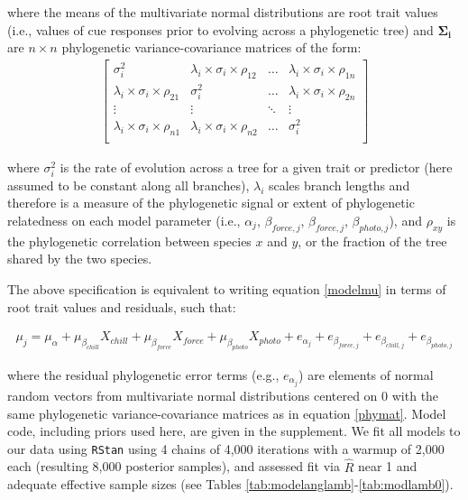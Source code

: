 \documentclass[11pt]{article}
\begin{document}
\noindent where the means of the multivariate normal distributions are root trait values (i.e., values of cue responses prior to evolving across a phylogenetic tree) and $\boldsymbol{\Sigma_i}$ %
are $n \times n$ phylogenetic variance-covariance matrices of the form: \\ 
\begin{align}
  \label{phymat}
\begin{bmatrix}
  \sigma^2_i & \lambda_i \times \sigma_{i} \times \rho_{12} & \ldots & \lambda_i \times \sigma_{i} \times \rho_{1n} \\
  \lambda_i \times \sigma_i \times \rho_{21} & \sigma^2_i & \ldots & \lambda_i \times \sigma_{i} \times \rho_{2n} \\
  \vdots & \vdots & \ddots & \vdots \\
  \lambda_i \times \sigma_i \times \rho_{n1} & \lambda_i \times \sigma_i \times \rho_{n2} & \ldots & \sigma^2_i \\
\end{bmatrix}
\end{align}

\noindent where $\sigma_i^2$ is the rate of evolution across a tree for a given trait or predictor (here assumed to be constant along all branches), $\lambda_i$ scales branch lengths and therefore is a measure of the phylogenetic signal or extent of phylogenetic relatedness on each model parameter (i.e., $\alpha_{j}$, $\beta_{force,j}$, $\beta_{force,j}$, $\beta_{photo,j}$), and $\rho_{xy}$ is the phylogenetic correlation between species $x$ and $y$, or the fraction of the tree shared by the two species.

The above specification is equivalent to writing equation \ref{modelmu} in terms of root trait values and residuals, such that:

\begin{align}
  \label{eqfive}
  \mu_j = \mu_\alpha + \mu_{\beta_{chill}} X_{chill} + \mu_{\beta_{force}} X_{force} + \mu_{\beta_{photo}} X_{photo} + e_{\alpha_{j}} + e_{\beta_{force,j}} + e_{\beta_{chill,j}} + e_{\beta_{photo,j}}
\end{align}

\noindent where the residual phylogenetic error terms (e.g., $e_{\alpha_{j}}$) are elements of normal random vectors from multivariate normal distributions centered on $0$ with the same phylogenetic variance-covariance matrices as in equation \ref{phymat}. Model code, including priors used here, are given in the supplement. We fit all models to our data using \verb|RStan| using 4 chains of 4,000 iterations with a warmup of 2,000 each (resulting 8,000 posterior samples), and assessed fit via $\hat{R}$ near 1 and adequate effective sample sizes (see Tables \ref{tab:modelanglamb}-\ref{tab:modlamb0}). 
\end{document}
